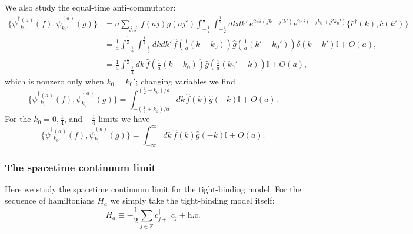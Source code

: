 \documentclass[prl,twocolumn,lengthcheck,superscriptaddress]{revtex4-1}
\theoremstyle{definition}
\theoremstyle{remark}
\begin{document}
We also study the equal-time anti-commutator:
\begin{equation}
	\begin{split}
		\{ {\widetilde{\psi}^\dag}{}^{(a)}_{k_0}(f),\widetilde{\psi}^{(a)}_{k_0'}(g) \} &= a\sum_{j,j'}f(aj)g(aj')\int_{-\frac12}^{\frac12}\int_{-\frac12}^{\frac12} dkdk'\, e^{2\pi i (jk-j'k')}e^{2\pi i (-jk_0+j'k_0')} \{\widehat{c}^\dag(k),\widehat{c}(k')\} \\
		&= \frac{1}{a}\int_{-\frac12}^{\frac12}\int_{-\frac12}^{\frac12} dkdk'\, \widehat{f}(\tfrac1a (k-k_0))\widehat{g}(\tfrac1a (k'-k_0')) \delta(k-k') \mathbb{I} + O(a),\\
		&= \frac{1}{a}\int_{-\frac12}^{\frac12} dk\, \widehat{f}(\tfrac1a (k-k_0))\widehat{g}(\tfrac1a (k_0'-k)) \mathbb{I} + O(a),
	\end{split}
\end{equation}
which is nonzero only when $k_0=k_0'$; changing variables we find
\begin{equation}
	\{ {\widetilde{\psi}^\dag}{}^{(a)}_{k_0}(f),\widetilde{\psi}^{(a)}_{k_0}(g) \} 
	= \int_{-(\frac12+k_0)/a}^{(\frac12-k_0)/a} dk\, \widehat{f}(k)\widehat{g}(-k) \mathbb{I} + O(a).
\end{equation}
For the $k_0 = 0,\frac14$, and $-\frac14$ limits we have 
\begin{equation}
	\{ {\widetilde{\psi}^\dag}{}^{(a)}_{k_0}(f),\widetilde{\psi}^{(a)}_{k_0}(g) \} 
	= \int_{-\infty}^{\infty} dk\, \widehat{f}(k)\widehat{g}(-k) \mathbb{I} + O(a).
\end{equation}


\subsubsection{The spacetime continuum limit}
Here we study the spacetime continuum limit for the tight-binding model. For the sequence of hamiltonians $H_a$ we simply take the tight-binding model itself:
\begin{equation}
	H_a \equiv -\frac12 \sum_{j\in\mathbb{Z}} c_{j+1}^\dag c_j + \text{h.c.}
\end{equation}
\end{document}
